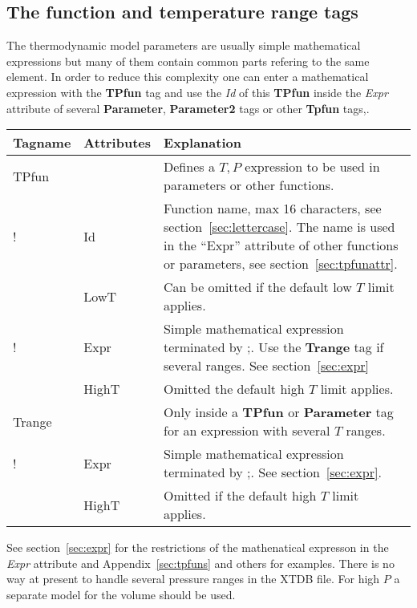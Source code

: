 \documentclass{article}
\begin{document}
\subsection{The function and temperature range tags}\label{sec:tpfun}

The thermodynamic model parameters are usually simple mathematical
expressions but many of them contain common parts refering to the same
element.  In order to reduce this complexity one can enter a
mathematical expression with the {\bf TPfun} tag and use the {\em Id}
of this {\bf TPfun} inside the {\em Expr} attribute of several {\bf
  Parameter}, {\bf Parameter2} tags or other {\bf Tpfun} tags,.  

\begin{tabular}{|p{} p{} p{}|}\hline
  Tagname & Attributes & Explanation\\\hline

  TPfun & & Defines a $T, P$ expression to be used in parameters or other functions.\\
!        & Id & Function name, max 16 characters, see 
           section~\ref{sec:lettercase}.  The name is used in the
         ``Expr'' attribute of other functions or parameters, 
           see section~\ref{sec:tpfunattr}.\\
        & LowT & Can be omitted if the default low $T$ limit applies.\\
!       & Expr &  Simple mathematical expression terminated by ;.   Use the {\bf Trange} tag if several ranges.  See section~\ref{sec:expr}\\
        & HighT & Omitted the default high $T$ limit applies.\\\hline

  Trange & & Only inside a {\bf TPfun} or {\bf Parameter} tag for an expression with several $T$ ranges.\\ 
!         & Expr & Simple mathematical expression terminated by ;.  See section~\ref{sec:expr}.\\
         & HighT & Omitted if the default high $T$ limit applies.\\\hline
\end{tabular}

See section~\ref{sec:expr} for the restrictions of the mathenatical
expresson in the {\em Expr} attribute and Appendix~\ref{sec:tpfuns}
and others for examples.  There is no way at present to handle several
pressure ranges in the XTDB file.  For high $P$ a separate model for
the volume should be used.
\end{document}
